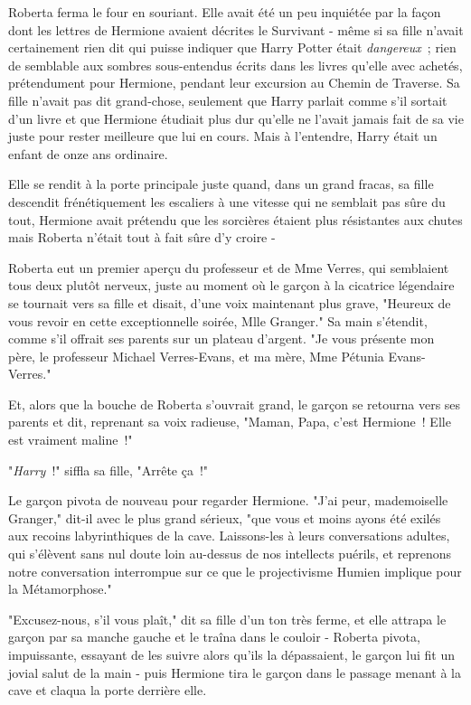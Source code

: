 Roberta ferma le four en souriant. Elle avait été un peu inquiétée par la façon dont les lettres de Hermione avaient décrites le Survivant - même si sa fille n'avait certainement rien dit qui puisse indiquer que Harry Potter était \emph{dangereux}~; rien de semblable aux sombres sous-entendus écrits dans les livres qu'elle avec achetés, prétendument pour Hermione, pendant leur excursion au Chemin de Traverse. Sa fille n'avait pas dit grand-chose, seulement que Harry parlait comme s'il sortait d'un livre et que Hermione étudiait plus dur qu'elle ne l'avait jamais fait de sa vie juste pour rester meilleure que lui en cours. Mais à l'entendre, Harry était un enfant de onze ans ordinaire.

Elle se rendit à la porte principale juste quand, dans un grand fracas, sa fille descendit frénétiquement les escaliers à une vitesse qui ne semblait pas sûre du tout, Hermione avait prétendu que les sorcières étaient plus résistantes aux chutes mais Roberta n'était tout à fait sûre d'y croire -

Roberta eut un premier aperçu du professeur et de Mme Verres, qui semblaient tous deux plutôt nerveux, juste au moment où le garçon à la cicatrice légendaire se tournait vers sa fille et disait, d'une voix maintenant plus grave, "Heureux de vous revoir en cette exceptionnelle soirée, Mlle Granger." Sa main s'étendit, comme s'il offrait ses parents sur un plateau d'argent. "Je vous présente mon père, le professeur Michael Verres-Evans, et ma mère, Mme Pétunia Evans-Verres."

Et, alors que la bouche de Roberta s'ouvrait grand, le garçon se retourna vers ses parents et dit, reprenant sa voix radieuse, "Maman, Papa, c'est Hermione~! Elle est vraiment maline~!"

"\emph{Harry}~!" siffla sa fille, "Arrête ça~!"

Le garçon pivota de nouveau pour regarder Hermione. "J'ai peur, mademoiselle Granger," dit-il avec le plus grand sérieux, "que vous et moins ayons été exilés aux recoins labyrinthiques de la cave. Laissons-les à leurs conversations adultes, qui s'élèvent sans nul doute loin au-dessus de nos intellects puérils, et reprenons notre conversation interrompue sur ce que le projectivisme Humien implique pour la Métamorphose."

"Excusez-nous, s'il vous plaît," dit sa fille d'un ton très ferme, et elle attrapa le garçon par sa manche gauche et le traîna dans le couloir - Roberta pivota, impuissante, essayant de les suivre alors qu'ils la dépassaient, le garçon lui fit un jovial salut de la main - puis Hermione tira le garçon dans le passage menant à la cave et claqua la porte derrière elle.

